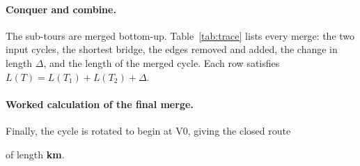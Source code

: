 \paragraph{Conquer and combine.} The sub-tours are merged bottom-up. Table~\ref{tab:trace} lists every
merge: the two input cycles, the shortest bridge, the edges removed and added, the change in length
$\Delta$, and the length of the merged cycle. Each row satisfies
$L(T) = L(T_1) + L(T_2) + \Delta$.

\begin{table}[H]
\centering
\caption{Merge steps (bottom-up). Edge weights in km are given in parentheses.}\label{tab:trace}
\vspace{4pt}
\scriptsize
\setlength{\tabcolsep}{3pt}

\end{table}

\paragraph{Worked calculation of the final merge.}


Finally, the cycle is rotated to begin at V0, giving the closed route
\begin{center}
\DCRoute{}
\end{center}
of length \textbf{\DCTotal{} km}.
